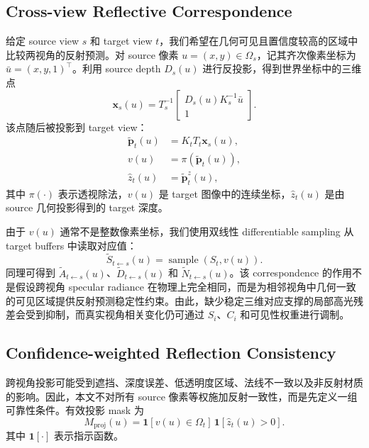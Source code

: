 \documentclass[UTF8,a4paper,11pt]{ctexart}
\newcommand{\Ind}[1]{\mathbf{1}\!\left[#1\right]}
\begin{document}
\subsection{Cross-view Reflective Correspondence}

给定 source view \(s\) 和 target view \(t\)，我们希望在几何可见且置信度较高的区域中比较两视角的反射预测。对 source 像素 \(u=(x,y)\in\Omega_s\)，记其齐次像素坐标为 \(\bar{u}=(x,y,1)^\top\)。利用 source depth \(D_s(u)\) 进行反投影，得到世界坐标中的三维点
\begin{equation}
\mathbf{x}_s(u)=
T_s^{-1}
\begin{bmatrix}
D_s(u)K_s^{-1}\bar{u}\\
1
\end{bmatrix}.
\end{equation}
该点随后被投影到 target view：
\begin{equation}
\begin{aligned}
\tilde{\mathbf{p}}_t(u) &= K_tT_t\mathbf{x}_s(u),\\
v(u) &= \pi(\tilde{\mathbf{p}}_t(u)),\\
\hat{z}_t(u) &= \tilde{\mathbf{p}}_t^z(u),
\end{aligned}
\end{equation}
其中 \(\pi(\cdot)\) 表示透视除法，\(v(u)\) 是 target 图像中的连续坐标，\(\hat{z}_t(u)\) 是由 source 几何投影得到的 target 深度。

由于 \(v(u)\) 通常不是整数像素坐标，我们使用双线性 differentiable sampling 从 target buffers 中读取对应值：
\begin{equation}
\tilde{S}_{t\leftarrow s}(u)=
\operatorname{sample}(S_t,v(u)).
\end{equation}
同理可得到 \(\tilde{A}_{t\leftarrow s}(u)\)、\(\tilde{D}_{t\leftarrow s}(u)\) 和 \(\tilde{N}_{t\leftarrow s}(u)\)。该 correspondence 的作用不是假设跨视角 specular radiance 在物理上完全相同，而是为相邻视角中几何一致的可见区域提供反射预测稳定性约束。由此，缺少稳定三维对应支撑的局部高光残差会受到抑制，而真实视角相关变化仍可通过 \(S_i\)、\(C_i\) 和可见性权重进行调制。

\subsection{Confidence-weighted Reflection Consistency}

跨视角投影可能受到遮挡、深度误差、低透明度区域、法线不一致以及非反射材质的影响。因此，本文不对所有 source 像素等权施加反射一致性，而是先定义一组可靠性条件。有效投影 mask 为
\begin{equation}
M_{\mathrm{proj}}(u)=
\Ind{v(u)\in\Omega_t}\,
\Ind{\hat{z}_t(u)>0}.
\end{equation}
其中 \(\Ind{\cdot}\) 表示指示函数。
\end{document}
